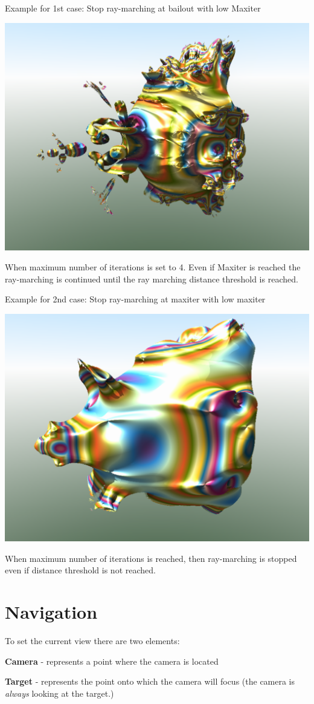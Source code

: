 \begin{samepage} Example for 1st case: Stop ray-marching at bailout with low
	Maxiter
	
	\includegraphics[width=0.5\linewidth]{img/manual/media/stop_raymarching_at_disttrhersh_iter4}
	
	When maximum number of iterations is set to 4. Even if Maxiter is reached the
	ray-marching is continued until the ray marching distance threshold is reached.
\end{samepage}

\begin{samepage} Example for 2nd case: Stop ray-marching at maxiter with low
	maxiter
	
	\includegraphics[width=0.5\linewidth]{img/manual/media/stop_raymarching_at_maxiter_iter4}
	
	When maximum number of iterations is reached, then ray-marching is stopped even
	if distance threshold is not reached. \end{samepage}

\section{Navigation}\label{navigation}

To set the current view there are two elements:

\textbf{Camera} - represents a point where the camera is located

\textbf{Target} - represents the point onto which the camera will focus (the
camera is \emph{always} looking at the target.)

